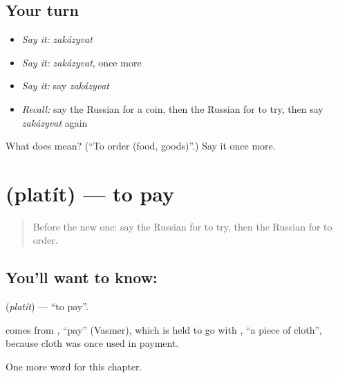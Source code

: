 \subsection*{Your turn}
\begin{itemize}
\raggedright
  \item \emph{Say it:} \emph{zakázyvat}
  \item \emph{Say it:} \emph{zakázyvat}, once more
  \item \emph{Say it:} say \emph{zakázyvat}
  \item \emph{Recall:} say the Russian for a coin, then the Russian for to try, then say \emph{zakázyvat} again
\end{itemize}

\begin{tcolorbox}[breakable,colback=teal!4,colframe=teal!35!black,title={Before you move on}]
What does  mean? (\textquotedblleft{}To order (food, goods)\textquotedblright{}.) Say it once more.
\end{tcolorbox}
\section[\texorpdfstring{\ru{платить} (platít)}{платить (platít)}]{ (platít) — to pay}

\label{lesson:RU-C204-platit}



\begin{quote}
Before the new one: say the Russian for to try, then the Russian for to order.
\end{quote}

\subsection*{You'll want to know: }
\textbf{} (\emph{platít}) — \textquotedblleft{}to pay\textquotedblright{}.

\begin{cousinweb}
\textbf{} comes from \emph{}, \textquotedblleft{}pay\textquotedblright{} (Vasmer), which is held to go with \emph{}, \textquotedblleft{}a piece of cloth\textquotedblright{}, because cloth was once used in payment.
\end{cousinweb}

\begin{grammarlens}[title={What you've built}]
One more word for this chapter.
\end{grammarlens}

